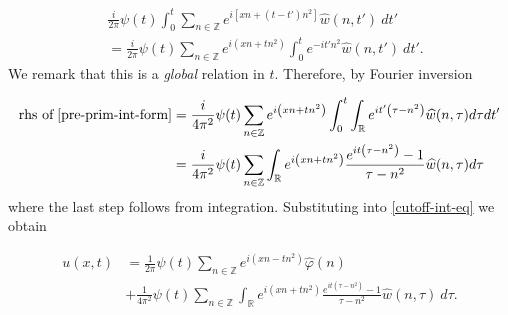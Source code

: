\documentclass[handout]{beamer}
\numberwithin{equation}{section}
\newcommand{\rr}{\mathbb{R}}
\newcommand{\zz}{\mathbb{Z}}
\newcommand{\wh}{\widehat}
\newcommand{\vp}{\varphi}
\begin{document}
\begin{frame}
%
%
\begin{equation}
	\label{pre-prim-int-form}
	\begin{split}
		& \frac{i }{2 \pi} \psi(t) \int_0^t \sum_{n \in \zz} 
		e^{i\left[ xn + (t - t')n^{2} \right]} \wh{w}(n, t') \ dt'
		\\
		& = \frac{i}{2 \pi} \psi(t) \sum_{n \in \zz} e^{i\left( xn + t 
		n^{2 } 
		\right)} \int_0^t e^{-it'n^{2 }} \wh{w}(n, t') \ dt'.
	\end{split}
\end{equation}
We remark that this is a \emph{global} relation in $t$. Therefore, by Fourier 
inversion
\end{frame}
%
%
%
%
%
\begin{frame}
%
%
\begin{equation*}
	\begin{split}
		\text{rhs of} \; \eqref{pre-prim-int-form}
		& = \frac{i}{4 \pi^2} \psi (t) \sum_{n \in \zz} e^{i\left( xn + t 
		n^{2 }
		\right)} \int_0^t \int_\rr e^{it'\left( \tau - n^{2 } \right) }
		\wh{w}(n, \tau) d \tau dt'
		\\
		& = \frac{i}{4 \pi^2} \psi(t) \sum_{n \in \zz} \int_\rr 
		e^{i\left( xn + tn^{2} \right)} \frac{e^{it\left( \tau - n^{2 } 
		\right)}-1}{\tau - n^{2 }} \wh{w}(n, \tau) d \tau
	\end{split}
\end{equation*}
%
%
where the last step follows from integration. Substituting
into \eqref{cutoff-int-eq} we obtain

\end{frame}

\begin{frame}
%
%
\begin{equation}
	\begin{split}
		\label{cutoff-int-eq-2}
		u(x, t)
		& = \frac{1}{2 \pi} \psi(t) \sum_{n \in \zz} e^{i(xn - tn^{2  
		})} \widehat{\vp}(n) 
		\\
		& + \frac{1}{4 \pi^2} \psi(t) \sum_{n \in \zz} \int_\rr
		e^{i(xn + tn^{2})} \frac{e^{it(\tau - n^{2})}- 1}{\tau - n^{2}} 
		\wh{w}(n, \tau) \ d \tau.
	\end{split}
\end{equation}
%
%
\end{frame}
\end{document}
